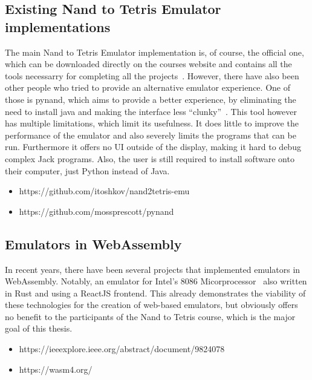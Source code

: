 \subsection{Existing Nand to Tetris Emulator implementations}

The main Nand to Tetris Emulator implementation is, of course, the official one, which can be downloaded directly on the courses website and contains all the tools necessarry for completing all the projects~\cite[Software]{n2tweb}.
However, there have also been other people who tried to provide an alternative emulator experience. One of those is pynand, which aims to provide a better experience, by eliminating the need to install java and making the interface less ``clunky''~\cite{pynand}. This tool however has multiple limitations, which limit its usefulness. It does little to improve the performance of the emulator and also severely limits the programs that can be run. Furthermore it offers no UI outside of the display, making it hard to debug complex Jack programs. Also, the user is still required to install software onto their computer, just Python instead of Java.

\begin{itemize}
  \item https://github.com/itoshkov/nand2tetris-emu
  \item https://github.com/mossprescott/pynand
\end{itemize}

\subsection{Emulators in WebAssembly}

In recent years, there have been several projects that implemented emulators in WebAssembly. Notably, an emulator for Intel's 8086 Micorprocessor~\cite{9824078} also written in Rust and using a ReactJS frontend. This already demonstrates the viability of these technologies for the creation of web-based emulators, but obviously offers no benefit to the participants of the Nand to Tetris course, which is the major goal of this thesis.

\begin{itemize}
  \item https://ieeexplore.ieee.org/abstract/document/9824078
  \item https://wasm4.org/
\end{itemize}
